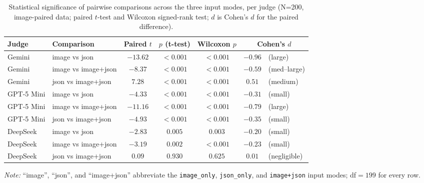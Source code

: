 \documentclass[12pt,a4paper]{report}
\begin{document}
\begin{table}[htbp]
    \centering
    \footnotesize
    \caption{Statistical significance of pairwise comparisons across the three input modes, per judge (N=200, image-paired data; paired $t$-test and Wilcoxon signed-rank test; $d$ is Cohen's $d$ for the paired difference).}
    \label{tab:4.6}
    \begin{tabular}{@{}llccccl@{}}
        \toprule
        \textbf{Judge} & \textbf{Comparison} & \textbf{Paired $t$} & \textbf{$p$ (t-test)} & \textbf{Wilcoxon $p$} & \multicolumn{2}{c}{\textbf{Cohen's $d$}} \\
        \midrule
        Gemini      & image vs json         & $-13.62$ & $<0.001$ & $<0.001$ & $-0.96$ & (large) \\
        Gemini      & image vs image+json   & $-8.37$  & $<0.001$ & $<0.001$ & $-0.59$ & (med--large) \\
        Gemini      & json vs image+json    & $7.28$   & $<0.001$ & $<0.001$ & $0.51$  & (medium) \\
        GPT-5 Mini  & image vs json         & $-4.33$  & $<0.001$ & $<0.001$ & $-0.31$ & (small) \\
        GPT-5 Mini  & image vs image+json   & $-11.16$ & $<0.001$ & $<0.001$ & $-0.79$ & (large) \\
        GPT-5 Mini  & json vs image+json    & $-4.93$  & $<0.001$ & $<0.001$ & $-0.35$ & (small) \\
        DeepSeek    & image vs json         & $-2.83$  & $0.005$  & $0.003$  & $-0.20$ & (small) \\
        DeepSeek    & image vs image+json   & $-3.19$  & $0.002$  & $<0.001$ & $-0.23$ & (small) \\
        DeepSeek    & json vs image+json    & $0.09$   & $0.930$  & $0.625$  & $0.01$  & (negligible) \\
        \bottomrule
    \end{tabular}
    \par\vspace{2pt}\footnotesize\textit{Note:} ``image'', ``json'', and ``image+json'' abbreviate the \texttt{image\_only}, \texttt{json\_only}, and \texttt{image+json} input modes; df$=199$ for every row.
\end{table}
\end{document}
